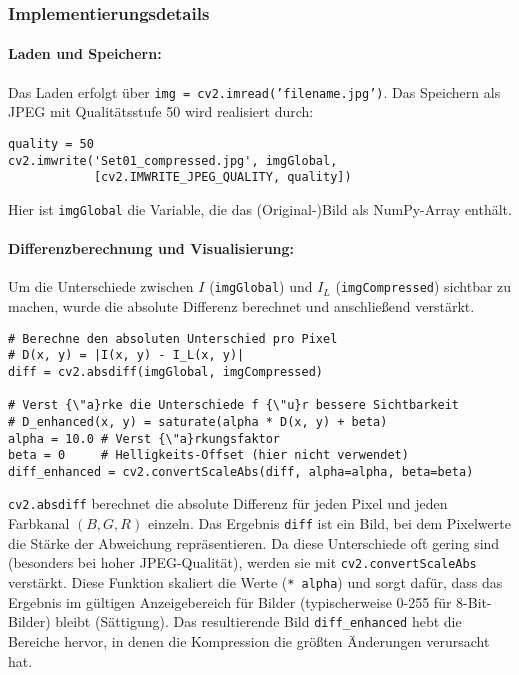 \documentclass[11pt, a4paper]{article}
\begin{document}
\subsubsection{Implementierungsdetails}
\paragraph{Laden und Speichern:}
Das Laden erfolgt über \texttt{img = cv2.imread('filename.jpg')}. Das Speichern als JPEG mit Qualitätsstufe 50 wird realisiert durch:
\begin{lstlisting}[caption={Speichern eines Bildes als JPEG mit Qualitätsstufe 50}]
quality = 50
cv2.imwrite('Set01_compressed.jpg', imgGlobal, 
            [cv2.IMWRITE_JPEG_QUALITY, quality])
\end{lstlisting}
Hier ist \texttt{imgGlobal} die Variable, die das (Original-)Bild als NumPy-Array enthält.

\paragraph{Differenzberechnung und Visualisierung:}
Um die Unterschiede zwischen $I$ (\texttt{imgGlobal}) und $I_L$ (\texttt{imgCompressed}) sichtbar zu machen, wurde die absolute Differenz berechnet und anschließend verstärkt.
\begin{lstlisting}[caption={Berechnung und Verstärkung des Differenzbildes}]
# Berechne den absoluten Unterschied pro Pixel
# D(x, y) = |I(x, y) - I_L(x, y)|
diff = cv2.absdiff(imgGlobal, imgCompressed)

# Verst {\"a}rke die Unterschiede f {\"u}r bessere Sichtbarkeit
# D_enhanced(x, y) = saturate(alpha * D(x, y) + beta)
alpha = 10.0 # Verst {\"a}rkungsfaktor
beta = 0     # Helligkeits-Offset (hier nicht verwendet)
diff_enhanced = cv2.convertScaleAbs(diff, alpha=alpha, beta=beta) 
\end{lstlisting}
\texttt{cv2.absdiff} berechnet die absolute Differenz für jeden Pixel und jeden Farbkanal $(B, G, R)$ einzeln. Das Ergebnis \texttt{diff} ist ein Bild, bei dem Pixelwerte die Stärke der Abweichung repräsentieren. Da diese Unterschiede oft gering sind (besonders bei hoher JPEG-Qualität), werden sie mit \texttt{cv2.convertScaleAbs} verstärkt. Diese Funktion skaliert die Werte (\texttt{* alpha}) und sorgt dafür, dass das Ergebnis im gültigen Anzeigebereich für Bilder (typischerweise 0-255 für 8-Bit-Bilder) bleibt (Sättigung). Das resultierende Bild \texttt{diff\_enhanced} hebt die Bereiche hervor, in denen die Kompression die größten Änderungen verursacht hat.
\end{document}
